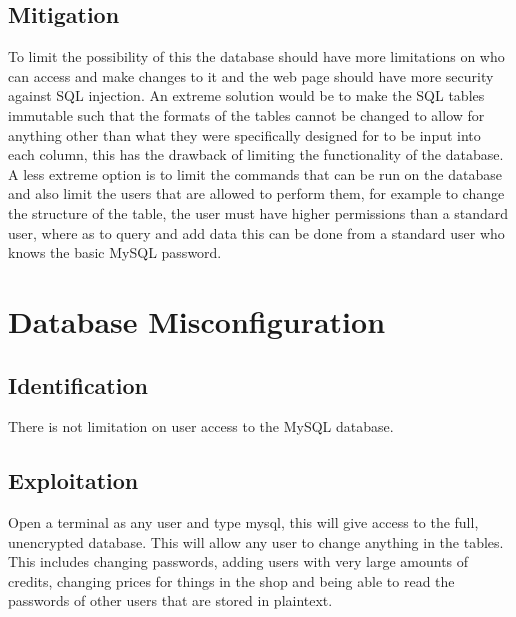\documentclass[paper=a4, fontsize=11pt]{scrartcl}
\numberwithin{equation}{section}		%
\numberwithin{figure}{section}			%
\numberwithin{table}{section}				%
\begin{document}
\subsection*{Mitigation}


To limit the possibility of this the database should have more limitations on who can access and make changes to it and the web page should have more security against SQL injection. An extreme solution would be to make the SQL tables immutable such that the formats of the tables cannot be changed to allow for anything other than what they were specifically designed for to be input into each column, this has the drawback of limiting the functionality of the database. A less extreme option is to limit the commands that can be run on the database and also limit the users that are allowed to perform them, for example to change the structure of the table, the user must have higher permissions than a standard user, where as to query and add data this can be done from a standard user who knows the basic MySQL password.

\section*{Database Misconfiguration}
\subsection*{Identification}


There is not limitation on user access to the MySQL database.

\subsection*{Exploitation}


Open a terminal as any user and type mysql, this will give access to the full, unencrypted database. This will allow any user to change anything in the tables. This includes changing passwords, adding users with very large amounts of credits, changing prices for things in the shop and being able to read the passwords of other users that are stored in plaintext.
\end{document}
